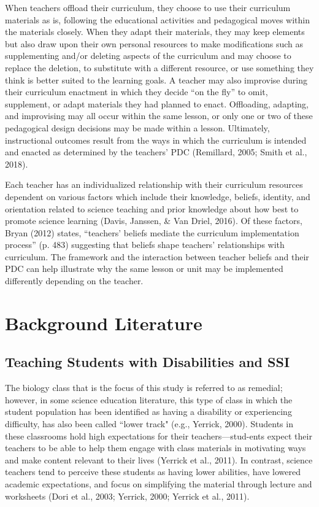 \documentclass[11.5pt]{sig-alternate}
\begin{document}
\begin{large}
When teachers offload their curriculum, they choose to use their curriculum materials as is, following the educational activities and pedagogical moves within the materials closely. When they adapt their materials, they may keep elements but also draw upon their own personal resources to make modifications such as supplementing and/or deleting aspects of the curriculum and may choose to replace the deletion, to substitute with a different resource, or use something they think is better suited to the learning goals. A teacher may also improvise during their curriculum enactment in which they decide “on the fly” to omit, supplement, or adapt materials they had planned to enact. Offloading, adapting, and improvising may all occur within the same lesson, or only one or two of these pedagogical design decisions may be made within a lesson. Ultimately, instructional outcomes result from the ways in which the curriculum is intended and enacted as determined by the teachers’ PDC (Remillard, 2005; Smith et al., 2018).

Each teacher has an individualized relationship with their curriculum resources dependent on various factors which include their knowledge, beliefs, identity, and orientation related to science teaching and prior knowledge about how best to promote science learning (Davis, Janssen, \& Van Driel, 2016). Of these factors, Bryan (2012) states, “teachers’ beliefs mediate the curriculum implementation process” (p. 483) suggesting that beliefs shape teachers’ relationships with curriculum. The framework and the interaction between teacher beliefs and their PDC can help illustrate why the same lesson or unit may be implemented differently depending on the teacher.

\section*{Background Literature}
\subsection*{Teaching Students with Disabilities and SSI}

The biology class that is the focus of this study is referred to as remedial; however, in some science education literature, this type of class in which the student population has been identified as having a disability or experiencing difficulty, has also been called “lower track" (e.g., Yerrick, 2000). Students in these classrooms hold high expectations for their teachers—stud-ents expect their teachers to be able to help them engage with class materials in motivating ways and make content relevant to their lives (Yerrick et al., 2011). In contrast, science teachers tend to perceive these students as having lower abilities, have lowered academic expectations, and focus on simplifying the material through lecture and worksheets (Dori et al., 2003; Yerrick, 2000; Yerrick et al., 2011).


\end{large}
\end{document}
